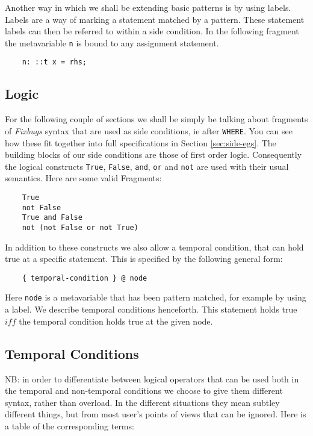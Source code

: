 \documentclass[final,twoside,12pt]{article}
\newcommand{\fixbugs}{{\emph{Fixbugs} }}
\begin{document}
Another way in which we shall be extending basic patterns is by using labels.  Labels are a way of marking
a statement matched by a pattern.  These statement labels can then be referred to within a side condition.
In the following fragment the metavariable {\tt n} is bound to any assignment statement.

\begin{lstlisting}
    n: ::t x = rhs;
\end{lstlisting}

\subsection{Logic}

For the following couple of sections we shall be simply be talking about fragments of \fixbugs syntax that
are used as side conditions, ie after {\tt WHERE}.  You can see how these fit together into full specifications
in Section \ref{sec:side-egs}.  The building blocks of our side conditions are those of first order logic.
Consequently the logical constructs {\tt True}, {\tt False}, {\tt and}, {\tt or} and {\tt not} are used with their
usual semantics.  Here are some valid Fragments:

\begin{lstlisting}
    True
    not False
    True and False
    not (not False or not True)
\end{lstlisting}

In addition to these constructs we also allow a temporal condition, that can hold true at a specific statement.
This is specified by the following general form:

\begin{lstlisting}
    { temporal-condition } @ node
\end{lstlisting}

Here {\tt node} is a metavariable that has been pattern matched, for example by using a label.  We describe
temporal conditions henceforth.  This statement holds true $iff$ the temporal condition holds true at the
given node.

\subsection{Temporal Conditions}

NB: in order to differentiate between logical operators that can be used both in the temporal and non-temporal
conditions we choose to give them different syntax, rather than overload.  In the different situations they mean
subtley different things, but from most user's points of views that can be ignored.  Here is a table of the corresponding
terms:
\end{document}
